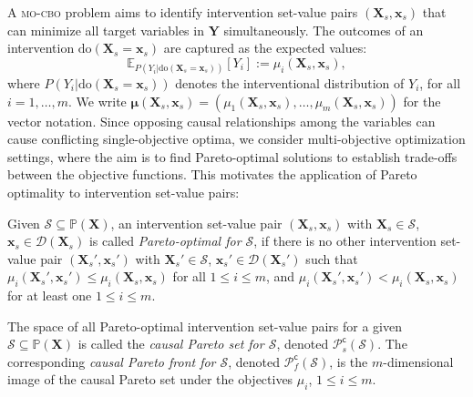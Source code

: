 A \textsc{mo-cbo} problem aims to identify intervention set-value pairs $(\mathbf{X}_s, 
\mathbf{x}_s)$ that can minimize all target variables in $\mathbf{Y}$ simultaneously. The outcomes of an intervention $\text{do}(\mathbf{X}_s=\mathbf{x}_s)$ are captured as the expected values:
\begin{equation}
\label{eq:exp_target}
    \mathbb{E}_{P(Y_i | \text{do}(\mathbf{X}_s=\mathbf{x}_s))}[Y_i] := \mu_i(\mathbf{X}_s,\mathbf{x}_s),
\end{equation}
where $P(Y_i | \text{do}(\mathbf{X}_s=\mathbf{x}_s))$ denotes the interventional distribution of $Y_i$, for all $i=1,\dots,m$.  
We write $\boldsymbol{\mu}(\mathbf{X}_s,\mathbf{x}_s) = (\mu_1(\mathbf{X}_s,\mathbf{x}_s),\dots,\mu_m(\mathbf{X}_s,\mathbf{x}_s))$ for the vector notation. Since opposing causal relationships among the variables can cause conflicting single-objective optima, we consider multi-objective optimization settings, where the aim is to find Pareto-optimal solutions to establish trade-offs between the objective functions. This motivates the application of Pareto optimality to intervention set-value pairs: 


\begin{definition}
    Given $\mathcal{S} \subseteq \mathbb{P}(\mathbf{X})$, an intervention set-value pair $(\mathbf{X}_s, \mathbf{x}_s)$ with $\mathbf{X}_s \in \mathcal{S}$, $\mathbf{x}_s \in \mathcal{D}(\mathbf{X}_s)$ is called \textit{Pareto-optimal for $\mathcal{S}$}, if there is no other intervention set-value pair $(\mathbf{X}_s', \mathbf{x}_s')$ with $\mathbf{X}_s' \in \mathcal{S}$, $\mathbf{x}_s' \in \mathcal{D}(\mathbf{X}_s')$ such that $\mu_i(\mathbf{X}_s', \mathbf{x}_s') \leq \mu_i(\mathbf{X}_s, \mathbf{x}_s)$ for all $1 \leq i \leq m$, and $\mu_i(\mathbf{X}_s', \mathbf{x}_s') < \mu_i(\mathbf{X}_s, \mathbf{x}_s)$ for at least one $1 \leq i \leq m$.
\end{definition}

\begin{definition}
    The space of all Pareto-optimal intervention set-value pairs for a given $\mathcal{S} \subseteq \mathbb{P}(\mathbf{X})$ is called the \textit{causal Pareto set for $\mathcal{S}$}, denoted $\mathcal{P}^{\mathsf{c}}_s(\mathcal{S})$. The corresponding \textit{causal Pareto front for $\mathcal{S}$}, denoted $\mathcal{P}^{\mathsf{c} }_f(\mathcal{S})$, is the $m$-dimensional image of the causal Pareto set under the objectives $\mu_i$, $1 \leq i \leq m$.
\end{definition}

